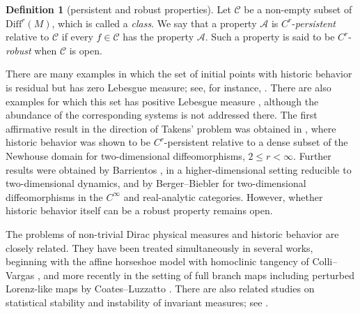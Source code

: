 \documentclass{amsart}
\theoremstyle{definition}
\newtheorem{dfn}[thm]{Definition}
\numberwithin{equation}{section}
\numberwithin{figure}{section}
\begin{document}
\begin{dfn}[persistent and robust properties]\label{PR}
Let $\mathcal{C}$ be a non-empty subset of
$\mathrm{Diff}^r(M)$, which is called a \emph{class}.
We say that a property $\mathscr{A}$ is $C^r$-\emph{persistent} relative to $\mathcal{C}$ if every $f\in \mathcal{C}$ has the property $\mathscr{A}$. Such a property is said to be $C^r$-\emph{robust} when $\mathcal{C}$ is open.
\end{dfn}

There are many examples in which the set of initial points with historic behavior is residual but has zero Lebesgue measure; see, for instance, \cite{T08, BLV14, KLS16, Ya20, BKNRS20, AP21, CCSV24, P}. There are also examples for which this set has positive Lebesgue measure \cite{CV01, CYZ20, Sb21, Tal22}, although the abundance of the corresponding systems is not addressed there. The first affirmative result in the direction of Takens' problem was obtained in \cite{KS17}, where historic behavior was shown to be $C^r$-persistent relative to a dense subset of the Newhouse domain for two-dimensional diffeomorphisms, $2\le r<\infty$. Further results were obtained by Barrientos \cite{B22}, in a higher-dimensional setting reducible to two-dimensional dynamics, and by Berger--Biebler \cite{BB23} for two-dimensional diffeomorphisms in the $C^\infty$ and real-analytic categories. However, whether historic behavior itself can be a robust property remains open.

The problems of non-trivial Dirac physical measures and historic behavior are closely related. They have been treated simultaneously in several works, beginning with the affine horseshoe model with homoclinic tangency of Colli--Vargas \cite{CV01}, and more recently in the setting of full branch maps including perturbed Lorenz-like maps by Coates--Luzzatto \cite{CL}. There are also related studies on statistical stability and instability of invariant measures; see \cite{DHL06, AGL26,Tal}.
\end{document}
